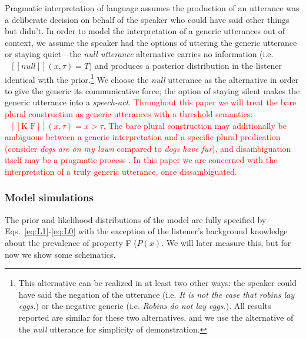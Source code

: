 \documentclass[12pt,letterpaper]{article}
\newcommand{\denote}[1]{\mbox{ $[\![ #1 ]\!]$}}
\newcommand{\red}[1]{\textcolor{Red}{#1}}
\begin{document}
Pragmatic interpretation of language assumes the production of an utterance was a deliberate decision on behalf of the speaker who could have said other things but didn't. 
In order to model the interpretation of a generic utterances out of context, we assume the speaker had the options of uttering the generic utterance or staying quiet---the \emph{null utterance} alternative carries no information (i.e.~$\denote{null}(x, \tau)=T$) and produces a posterior distribution in the listener identical with the prior.\footnote{
This alternative can be realized in at least two other ways: the speaker could have said the negation of the utterance (i.e. \emph{It is not the case that robins lay eggs.}) or the negative generic (i.e. \emph{Robins do not lay eggs.}). All results reported are similar for these two alternatives, and we use the alternative of the \emph{null} utterance for simplicity of demonstration.}
We choose the \emph{null} utterance as the alternative in order to give the generic its communicative force; the option of staying silent makes the generic utterance into a \emph{speech-act}.
%
\red{
Throughout this paper we will treat the bare plural construction as generic utterances with a threshold semantics: $\denote{\text{K F}}(x, \tau)=x>\tau$.
The bare plural construction may additionally be ambiguous between a generic interpretation and a specific plural predication (consider \emph{dogs are on my lawn} compared to \emph{dogs have fur}), and disambiguation itself may be a pragmatic process \cite{Cimpian2008}. 
In this paper we are concerned with the interpretation of a truly generic utterance, once dissambiguated.
}

\subsubsection*{Model simulations}

The prior and likelihood distributions of the model are fully specified by Eqs.~\ref{eq:L1}-\ref{eq:L0} with the exception of the listener's background knowledge about the prevalence of property F ($P(x)$.
We will later measure this, but for now we show some schematics.
\end{document}
